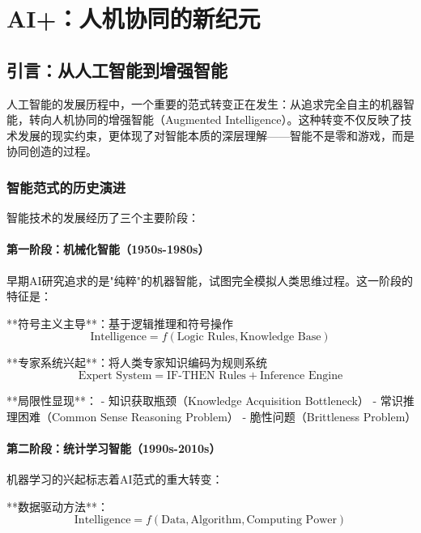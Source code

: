 \chapter{AI+：人机协同的新纪元}

\section{引言：从人工智能到增强智能}

人工智能的发展历程中，一个重要的范式转变正在发生：从追求完全自主的机器智能，转向人机协同的增强智能（Augmented Intelligence）。这种转变不仅反映了技术发展的现实约束，更体现了对智能本质的深层理解——智能不是零和游戏，而是协同创造的过程。

\subsection{智能范式的历史演进} %

智能技术的发展经历了三个主要阶段：

\subsubsection{第一阶段：机械化智能（1950s-1980s）}

早期AI研究追求的是"纯粹"的机器智能，试图完全模拟人类思维过程。这一阶段的特征是：

**符号主义主导**：基于逻辑推理和符号操作
\begin{equation}
\text{Intelligence} = f(\text{Logic Rules}, \text{Knowledge Base})
\end{equation}

**专家系统兴起**：将人类专家知识编码为规则系统
\begin{equation}
\text{Expert System} = \text{IF-THEN Rules} + \text{Inference Engine}
\end{equation}

**局限性显现**：
- 知识获取瓶颈（Knowledge Acquisition Bottleneck）
- 常识推理困难（Common Sense Reasoning Problem）
- 脆性问题（Brittleness Problem）

\subsubsection{第二阶段：统计学习智能（1990s-2010s）}

机器学习的兴起标志着AI范式的重大转变：

**数据驱动方法**：
\begin{equation}
\text{Intelligence} = f(\text{Data}, \text{Algorithm}, \text{Computing Power})
\end{equation}

